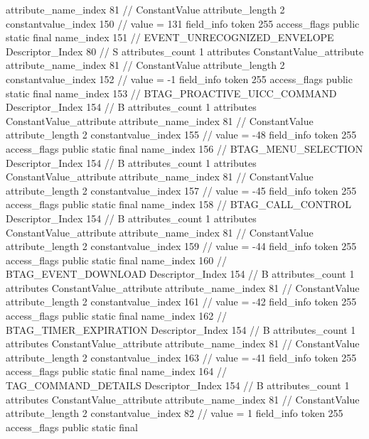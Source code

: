 {{{{{{{					attribute_name_index	81		// ConstantValue
					attribute_length	2
					constantvalue_index	150		// value = 131
				}
				}
			}
			field_info {
				token	255
				access_flags	public static final
				name_index	151		// EVENT_UNRECOGNIZED_ENVELOPE
				Descriptor_Index	80		// S
				attributes_count	1
				attributes {
				ConstantValue_attribute {
					attribute_name_index	81		// ConstantValue
					attribute_length	2
					constantvalue_index	152		// value = -1
				}
				}
			}
			field_info {
				token	255
				access_flags	public static final
				name_index	153		// BTAG_PROACTIVE_UICC_COMMAND
				Descriptor_Index	154		// B
				attributes_count	1
				attributes {
				ConstantValue_attribute {
					attribute_name_index	81		// ConstantValue
					attribute_length	2
					constantvalue_index	155		// value = -48
				}
				}
			}
			field_info {
				token	255
				access_flags	public static final
				name_index	156		// BTAG_MENU_SELECTION
				Descriptor_Index	154		// B
				attributes_count	1
				attributes {
				ConstantValue_attribute {
					attribute_name_index	81		// ConstantValue
					attribute_length	2
					constantvalue_index	157		// value = -45
				}
				}
			}
			field_info {
				token	255
				access_flags	public static final
				name_index	158		// BTAG_CALL_CONTROL
				Descriptor_Index	154		// B
				attributes_count	1
				attributes {
				ConstantValue_attribute {
					attribute_name_index	81		// ConstantValue
					attribute_length	2
					constantvalue_index	159		// value = -44
				}
				}
			}
			field_info {
				token	255
				access_flags	public static final
				name_index	160		// BTAG_EVENT_DOWNLOAD
				Descriptor_Index	154		// B
				attributes_count	1
				attributes {
				ConstantValue_attribute {
					attribute_name_index	81		// ConstantValue
					attribute_length	2
					constantvalue_index	161		// value = -42
				}
				}
			}
			field_info {
				token	255
				access_flags	public static final
				name_index	162		// BTAG_TIMER_EXPIRATION
				Descriptor_Index	154		// B
				attributes_count	1
				attributes {
				ConstantValue_attribute {
					attribute_name_index	81		// ConstantValue
					attribute_length	2
					constantvalue_index	163		// value = -41
				}
				}
			}
			field_info {
				token	255
				access_flags	public static final
				name_index	164		// TAG_COMMAND_DETAILS
				Descriptor_Index	154		// B
				attributes_count	1
				attributes {
				ConstantValue_attribute {
					attribute_name_index	81		// ConstantValue
					attribute_length	2
					constantvalue_index	82		// value = 1
				}
				}
			}
			field_info {
				token	255
				access_flags	public static final
}}}}}
